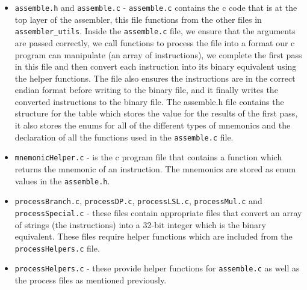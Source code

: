 \documentclass[11pt]{article}
\begin{document}
\begin{itemize}
	\item {\tt{assemble.h}} and {\tt{assemble.c}} - {\tt{assemble.c}} contains the c code that is at the top layer of the assembler, this file functions from the other files in {\tt{assembler\_utils}}. Inside the {\tt{assemble.c}} file, we ensure that the arguments are passed correctly, we call functions to process the file into a format our c program can manipulate (an array of instructions), we complete the first pass in this file and then convert each instruction into its binary equivalent using the helper functions. The file also ensures the instructions are in the correct endian format before writing to the binary file, and it finally writes the converted instructions to the binary file.
    The assemble.h file contains the structure for the table which stores the value for the results of the first pass, it also stores the enums for all of the different types of mnemonics and the declaration of all the functions used in the {\tt{assemble.c}} file.
	
	\item {\tt{mnemonicHelper.c}} - is the c program file that contains a function which returns the mnemonic of an instruction. The mnemonics are stored as enum values in the {\tt{assemble.h}}.
	
	\item {\tt{processBranch.c}}, {\tt{processDP.c}}, {\tt{processLSL.c}}, {\tt{processMul.c}} and {\tt{processSpecial.c}} - these files contain appropriate files that convert an array of strings (the instructions) into a 32-bit integer which is the binary equivalent. These files require helper functions which are included from the {\tt{processHelpers.c}} file.
	\item {\tt{processHelpers.c}} - these provide helper functions for {\tt{assemble.c}} as well as the process files as mentioned previously.
	
\end{itemize}


\begin{center}

\end{center}
\end{document}
